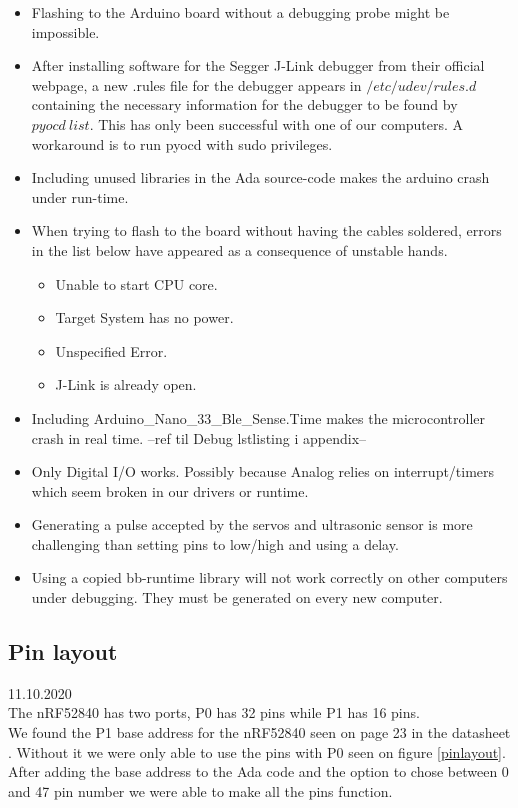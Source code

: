 \documentclass{article}
\begin{document}
\begin{itemize}
	\item Flashing to the Arduino board without a debugging probe might be impossible.

	\item After installing software for the Segger J-Link debugger from their official webpage, a new .rules file for the debugger appears in $/etc/udev/rules.d$ containing the necessary information for the debugger to be found by $pyocd\ list$. This has only been successful with one of our computers. A workaround is to run pyocd with sudo privileges.

	\item Including unused libraries in the Ada source-code makes the arduino crash under run-time.

	\item When trying to flash to the board without having the cables soldered, errors in the list below have appeared as a consequence of unstable hands.
		\begin{itemize}
			\item Unable to start CPU core.
			\item Target System has no power.
            \item Unspecified Error.
            \item J-Link is already open.
		\end{itemize}

	\item Including Arduino\_Nano\_33\_Ble\_Sense.Time makes the microcontroller crash in real time. --ref til Debug lstlisting i appendix--

	\item Only Digital I/O works. Possibly because Analog relies on interrupt/timers which seem broken in our drivers or runtime.

	\item Generating a pulse accepted by the servos and ultrasonic sensor is more challenging than setting pins to low/high and using a delay.

	\item Using a copied bb-runtime library will not work correctly on other computers under debugging. They must be generated on every new computer.

\end{itemize}

\subsection{Pin layout}
11.10.2020\\
The nRF52840 has two ports, P0 has 32 pins while P1 has 16 pins.\\ 
We found the P1 base address for the nRF52840 seen on page 23 in the datasheet \cite{NRF52840}. Without it we were only able to use the pins with P0 seen on figure \ref{pinlayout}. After adding the base address to the Ada code and the option to chose between 0 and 47 pin number we were able to make all the pins function.
\end{document}
